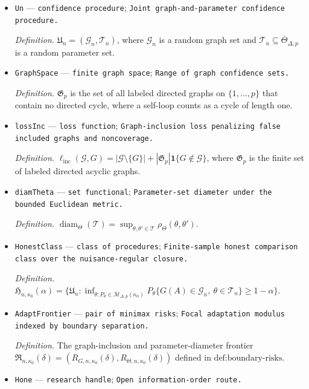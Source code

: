 \documentclass{article}
\begin{document}
\begin{itemize}
  \item \texttt{Un} --- \texttt{confidence procedure}; \texttt{Joint graph-\allowbreak{}and-\allowbreak{}parameter confidence procedure.}
  \par\smallskip\noindent\emph{Definition.} \(\mathfrak U_n=(\mathcal G_n,\mathcal T_n)\), where \(\mathcal G_n\) is a random graph set and \(\mathcal T_n\subseteq\overline\Theta_{\Delta,p}\) is a random parameter set.
  \item \texttt{GraphSpace} --- \texttt{finite graph space}; \texttt{Range of graph confidence sets.}
  \par\smallskip\noindent\emph{Definition.} \(\mathfrak G_p\) is the set of all labeled directed graphs on \(\{1,\ldots,p\}\) that contain no directed cycle, where a self-loop counts as a cycle of length one.
  \item \texttt{lossInc} --- \texttt{loss function}; \texttt{Graph-\allowbreak{}inclusion loss penalizing false included graphs and noncoverage.}
  \par\smallskip\noindent\emph{Definition.} \(\ell_{\mathrm{inc}}(\mathcal G,G)=|\mathcal G\setminus\{G\}|+|\mathfrak G_p|\mathbf1\{G\notin\mathcal G\}\), where \(\mathfrak G_p\) is the finite set of labeled directed acyclic graphs.
  \item \texttt{diamTheta} --- \texttt{set functional}; \texttt{Parameter-\allowbreak{}set diameter under the bounded Euclidean metric.}
  \par\smallskip\noindent\emph{Definition.} \(\operatorname{diam}_{\Theta}(\mathcal T)=\sup_{\theta,\theta'\in\mathcal T}\rho_{\Theta}(\theta,\theta')\).
  \item \texttt{HonestClass} --- \texttt{class of procedures}; \texttt{Finite-\allowbreak{}sample honest comparison class over the nuisance-\allowbreak{}regular closure.}
  \par\smallskip\noindent\emph{Definition.} \(\mathfrak H_{n,\kappa_0}(\alpha)=\{\mathfrak U_n:\inf_{\theta:P_{\theta}\in\overline{\mathcal M}_{\Delta,p}(\kappa_0)}P_{\theta}\{G(A)\in\mathcal G_n,\ \theta\in\mathcal T_n\}\geq1-\alpha\}\).
  \item \texttt{AdaptFrontier} --- \texttt{pair of minimax risks}; \texttt{Focal adaptation modulus indexed by boundary separation.}
  \par\smallskip\noindent\emph{Definition.} The graph-inclusion and parameter-diameter frontier \(\mathfrak R_{n,\kappa_0}(\delta)=(R_{G,n,\kappa_0}(\delta),R_{\Theta,n,\kappa_0}(\delta))\) defined in \(\text{def:boundary-risks}\).
  \item \texttt{Hone} --- \texttt{research handle}; \texttt{Open information-\allowbreak{}order route.}

\end{itemize}
\end{document}
